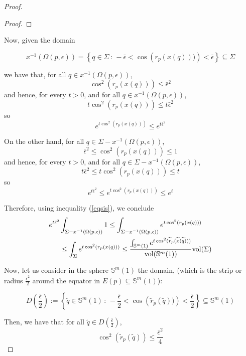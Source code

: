 \documentclass{amsart}
\theoremstyle{definition}
\theoremstyle{remark}
\newcommand{\ese}{\mathbb{S}}
\begin{document}
\begin{proof}
\begin{proof}
\end{proof}

Now, given the domain

$$
x^{-1}(\Omega(p,\epsilon))=\left\lbrace q \in \Sigma\,:\, -\bar \epsilon<\cos\left(r_p(x(q)))\right)<\bar \epsilon\right\rbrace \subseteq \Sigma
$$


\noindent we have that, for all $q \in x^{-1}(\Omega(p,\epsilon))$, 
$$  \cos^2(r_p(x(q)))\leq \bar\epsilon^2 $$ 
\noindent and hence, for every $t >0$, and for all $q \in x^{-1}(\Omega(p,\epsilon))$, $$t\cos^2(r_p(x(q)))\leq t\bar\epsilon^2$$
\noindent so $$e^{t\cos^2(r_p(x(q)))}\leq e^{t\bar\epsilon^2} $$

On the other hand,  for all $q \in\Sigma-x^{-1}(\Omega(p,\epsilon))$, 
$$ \bar\epsilon^2 \leq \cos^2(r_p(x(q)))\leq 1$$
\noindent and hence, for every $t >0$, and for all $q \in \Sigma- x^{-1}(\Omega(p,\epsilon))$,$$t\bar\epsilon^2\leq t \cos^2(r_p(x(q)))\leq t$$
\noindent so $$e^{t\bar\epsilon^2} \leq e^{t\cos^2(r_p(x(q)))} \leq e^t$$


Therefore, using inequality (\ref{eqsis}), we conclude
 \begin{equation}\label{eqsisBis}
 \begin{aligned}
e^{t\bar\epsilon^2}&\int_{\Sigma-x^{-1}(\Omega(p,\epsilon))} 1\leq 
\int_{\Sigma-x^{-1}(\Omega(p,\epsilon))}e^{t \cos^2(r_p(x(q)))}\\&\leq \int_\Sigma e^{t\cos^2(r_p(x(q)))} \leq \frac{\int_{\mathbb{S}^m(1)}e^{t \cos^2(\widetilde{r}_p(\widetilde{x}(\widetilde{q})))}}{{\rm vol}(\mathbb{S}^m(1))} {\rm vol}(\Sigma)
\end{aligned}
\end{equation}



\noindent Now, let us consider in the sphere $\mathbb{S}^m(1)$ the domain, (which is the strip or radius $\frac{\bar\epsilon^2}{2}$ around the equator in $E(p)\subseteq \ese^m(1)$):

$$
D(\frac{\bar\epsilon}{2}):=\left\lbrace \widetilde{q} \in \ese^m(1)\,:\, -\frac{\bar \epsilon}{2}<\cos\left(\widetilde{r}_p(\widetilde{q}))\right)<\frac{\bar \epsilon}{2}\right\rbrace \subseteq \ese^m(1)
$$

Then, we have that for all $\widetilde{q} \in D(\frac{\bar\epsilon}{2})$, 
$$\cos^2(\widetilde{r}_p(\widetilde{q}))\leq  \frac{\bar\epsilon^2}{4} $$


\end{proof}
\end{document}
